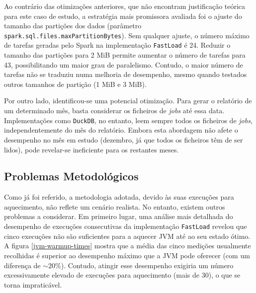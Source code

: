 \documentclass[11pt, a4paper]{article}
\begin{document}
Ao contrário das otimizações anteriores, que não encontram justificação teórica para este caso de
estudo, a estratégia mais promissora avaliada foi o ajuste do tamanho das partições dos dados
(parâmetro \texttt{spark.sql.files.maxPartitionBytes}). Sem qualquer ajuste, o número máximo de
tarefas geradas pelo Spark na implementação \texttt{FastLoad} é 24. Reduzir o tamanho das partições
para 2 MiB permite aumentar o número de tarefas para 43, possibilitando um maior grau de
paralelismo. Contudo, o maior número de tarefas não se traduziu numa melhoria de desempenho, mesmo
quando testados outros tamanhos de partição (1 MiB e 3 MiB).

Por outro lado, identificou-se uma potencial otimização. Para gerar o relatório de um determinado
mês, basta considerar os ficheiros de \emph{jobs} até essa data. Implementações como
\texttt{DuckDB}, no entanto, leem sempre todos os ficheiros de \emph{jobs}, independentemente do
mês do relatório. Embora esta abordagem não afete o desempenho no mês em estudo (dezembro, já que
todos os ficheiros têm de ser lidos), pode revelar-se ineficiente para os restantes meses.

\subsection{Problemas Metodológicos}

Como já foi referido, a metodologia adotada, devido às suas execuções para aquecimento, não reflete
um cenário realista. No entanto, existem outros problemas a considerar. Em primeiro lugar, uma
análise mais detalhada do desempenho de execuções consecutivas da implementação \texttt{FastLoad}
revelou que cinco execuções não são suficientes para a aquecer JVM até ao seu estado ótimo. A figura
\ref{jvm-warmup-times} mostra que a média das cinco medições usualmente recolhidas é superior ao
desempenho máximo que a JVM pode oferecer (com um diferença de $\sim 20 \%$). Contudo, atingir esse
desempenho exigiria um número excessivamente elevado de execuções para aquecimento (mais de 30), o
que se torna impraticável.
\end{document}
